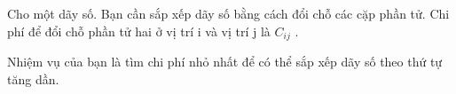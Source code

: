 Cho một dãy số. Bạn cần sắp xếp dãy số bằng cách đổi chỗ các cặp phần tử. Chi phí để đổi chỗ phần tử hai ở vị trí i và vị trí j là $C_{ij}$ .

Nhiệm vụ của bạn là tìm chi phí nhỏ nhất để có thể sắp xếp dãy số theo thứ tự tăng dần.
